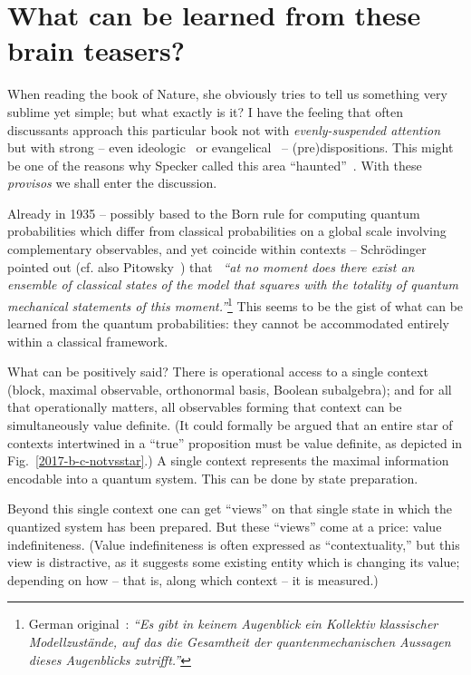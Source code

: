 \documentclass[%
  twocolumn,
 showpacs,
 showkeys,
 preprintnumbers,
 amsmath,amssymb,
 aps,
  pra,
  longbibliography,
 floatfix,
 ]{revtex4-1}
\begin{document}
\section{What can be learned from these brain teasers?}

When reading the book of Nature, she obviously tries to tell us something very sublime yet simple;
but what exactly is it?
I have the feeling that often discussants approach this particular book not with
{\em evenly-suspended attention}~\cite{Freud-1912,Freud-1912-e} but with strong
-- even ideologic~\cite{clauser-talkvie} or evangelical~\cite{zeil-05_nature_ofQuantum}
-- (pre)dispositions.
This might be one of the reasons why Specker called this area ``haunted''~\cite{Specker-priv-Oct2000}.
With these {\em provisos} we shall enter the discussion.


Already in 1935 -- possibly
based to the Born rule for computing quantum probabilities which
differ from classical probabilities on a global scale involving complementary observables,
and yet coincide within contexts --
Schr\"odinger pointed out (cf. also Pitowsky~\cite[footnote~2, p.~96]{Pit-94})
that~\cite[p.~327]{schrodinger-en-10.2307/986572}
{\em ``at no moment does there exist an ensemble of classical states of the model
that squares with the totality of quantum mechanical statements of this moment.''}\footnote{
German original~\cite[p.~811]{schrodinger}:
{\em ``Es gibt in keinem Augenblick ein Kollektiv klassischer Modellzust\"ande,
auf das die Gesamtheit der quantenmechanischen Aussagen dieses Augenblicks zutrifft.''}}
This seems to be the gist of what can be learned from the quantum probabilities:
they cannot be accommodated entirely within a classical framework.

What can be positively said?
There is operational access to a single  context (block, maximal observable, orthonormal basis, Boolean subalgebra);
and for all that operationally matters, all observables forming that context can be simultaneously value definite.
(It could formally be argued that an entire star of contexts intertwined in a ``true'' proposition
must be value definite, as depicted in Fig.~\ref{2017-b-c-notvsstar}.)
A single context represents the maximal information encodable into a quantum system.
This can be done by state preparation.


Beyond this single context
one can get ``views'' on that single state in which the quantized system has been prepared.
But these ``views'' come at a price: value indefiniteness.
(Value indefiniteness is often expressed as ``contextuality,'' but this view is distractive,
as it suggests some existing entity which is changing
its value; depending on how -- that is, along which context -- it is measured.)
\end{document}
